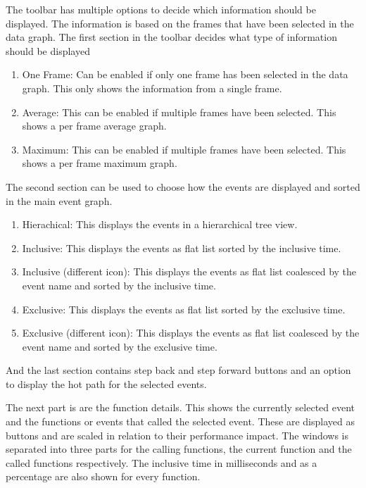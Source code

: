 The toolbar has multiple options to decide which information should be displayed. The information is based on the frames that have been selected in the data graph. The first section in the toolbar decides what type of information should be displayed

\begin{enumerate}
\item One Frame: Can be enabled if only one frame has been selected in the data graph. This only shows the information from a single frame.
\item Average: This can be enabled if multiple frames have been selected. This shows a per frame average graph.
\item Maximum: This can be enabled if multiple frames have been selected. This shows a per frame maximum graph.
\end{enumerate}
\citep{unreal_profiler}

The second section can be used to choose how the events are displayed and sorted in the main event graph.

\begin{enumerate}
\item Hierachical: This displays the events in a hierarchical tree view.
\item Inclusive: This displays the events as flat list sorted by the inclusive time.
\item Inclusive (different icon): This displays the events as flat list coalesced by the event name and sorted by the inclusive time.
\item Exclusive: This displays the events as flat list sorted by the exclusive time.
\item Exclusive (different icon): This displays the events as flat list coalesced by the event name and sorted by the exclusive time.
\end{enumerate}
\citep{unreal_profiler}

And the last section contains step back and step forward buttons and an option to display the hot path for the selected events.

The next part is are the function details. This shows the currently selected event and the functions or events that called the selected event. These are displayed as buttons and are scaled in relation to their performance impact. The windows is separated into three parts for the calling functions, the current function and the called functions respectively. The inclusive time in milliseconds and as a percentage are also shown for every function.
\citep{unreal_profiler}

